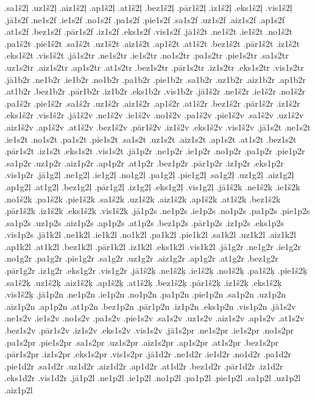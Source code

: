 {.sa1š2ļ
.uz1š2ļ
.aiz1š2ļ
.ap1š2ļ
.at1š2ļ
.bez1š2ļ
.pār1š2ļ
.iz1š2ļ
.eks1š2ļ
.vis1š2ļ
.jā1s2f
.ne1s2f
.ie1s2f
.no1s2f
.pa1s2f
.pie1s2f
.sa1s2f
.uz1s2f
.aiz1s2f
.ap1s2f
.at1s2f
.bez1s2f
.pār1s2f
.iz1s2f
.eks1s2f
.vis1s2f
.jā1š2t
.ne1š2t
.ie1š2t
.no1š2t
.pa1š2t
.pie1š2t
.sa1š2t
.uz1š2t
.aiz1š2t
.ap1š2t
.at1š2t
.bez1š2t
.pār1š2t
.iz1š2t
.eks1š2t
.vis1š2t
.jā1s2tr
.ne1s2tr
.ie1s2tr
.no1s2tr
.pa1s2tr
.pie1s2tr
.sa1s2tr
.uz1s2tr
.aiz1s2tr
.ap1s2tr
.at1s2tr
.bez1s2tr
.pār1s2tr
.iz1s2tr
.eks1s2tr
.vis1s2tr
.jā1b2r
.ne1b2r
.ie1b2r
.no1b2r
.pa1b2r
.pie1b2r
.sa1b2r
.uz1b2r
.aiz1b2r
.ap1b2r
.at1b2r
.bez1b2r
.pār1b2r
.iz1b2r
.eks1b2r
.vis1b2r
.jā1š2r
.ne1š2r
.ie1š2r
.no1š2r
.pa1š2r
.pie1š2r
.sa1š2r
.uz1š2r
.aiz1š2r
.ap1š2r
.at1š2r
.bez1š2r
.pār1š2r
.iz1š2r
.eks1š2r
.vis1š2r
.jā1š2v
.ne1š2v
.ie1š2v
.no1š2v
.pa1š2v
.pie1š2v
.sa1š2v
.uz1š2v
.aiz1š2v
.ap1š2v
.at1š2v
.bez1š2v
.pār1š2v
.iz1š2v
.eks1š2v
.vis1š2v
.jā1s2t
.ne1s2t
.ie1s2t
.no1s2t
.pa1s2t
.pie1s2t
.sa1s2t
.uz1s2t
.aiz1s2t
.ap1s2t
.at1s2t
.bez1s2t
.pār1s2t
.iz1s2t
.eks1s2t
.vis1s2t
.jā1p2r
.ne1p2r
.ie1p2r
.no1p2r
.pa1p2r
.pie1p2r
.sa1p2r
.uz1p2r
.aiz1p2r
.ap1p2r
.at1p2r
.bez1p2r
.pār1p2r
.iz1p2r
.eks1p2r
.vis1p2r
.jā1g2ļ
.ne1g2ļ
.ie1g2ļ
.no1g2ļ
.pa1g2ļ
.pie1g2ļ
.sa1g2ļ
.uz1g2ļ
.aiz1g2ļ
.ap1g2ļ
.at1g2ļ
.bez1g2ļ
.pār1g2ļ
.iz1g2ļ
.eks1g2ļ
.vis1g2ļ
.jā1š2k
.ne1š2k
.ie1š2k
.no1š2k
.pa1š2k
.pie1š2k
.sa1š2k
.uz1š2k
.aiz1š2k
.ap1š2k
.at1š2k
.bez1š2k
.pār1š2k
.iz1š2k
.eks1š2k
.vis1š2k
.jā1p2s
.ne1p2s
.ie1p2s
.no1p2s
.pa1p2s
.pie1p2s
.sa1p2s
.uz1p2s
.aiz1p2s
.ap1p2s
.at1p2s
.bez1p2s
.pār1p2s
.iz1p2s
.eks1p2s
.vis1p2s
.jā1k2l
.ne1k2l
.ie1k2l
.no1k2l
.pa1k2l
.pie1k2l
.sa1k2l
.uz1k2l
.aiz1k2l
.ap1k2l
.at1k2l
.bez1k2l
.pār1k2l
.iz1k2l
.eks1k2l
.vis1k2l
.jā1g2r
.ne1g2r
.ie1g2r
.no1g2r
.pa1g2r
.pie1g2r
.sa1g2r
.uz1g2r
.aiz1g2r
.ap1g2r
.at1g2r
.bez1g2r
.pār1g2r
.iz1g2r
.eks1g2r
.vis1g2r
.jā1š2ķ
.ne1š2ķ
.ie1š2ķ
.no1š2ķ
.pa1š2ķ
.pie1š2ķ
.sa1š2ķ
.uz1š2ķ
.aiz1š2ķ
.ap1š2ķ
.at1š2ķ
.bez1š2ķ
.pār1š2ķ
.iz1š2ķ
.eks1š2ķ
.vis1š2ķ
.jā1p2n
.ne1p2n
.ie1p2n
.no1p2n
.pa1p2n
.pie1p2n
.sa1p2n
.uz1p2n
.aiz1p2n
.ap1p2n
.at1p2n
.bez1p2n
.pār1p2n
.iz1p2n
.eks1p2n
.vis1p2n
.jā1s2v
.ne1s2v
.ie1s2v
.no1s2v
.pa1s2v
.pie1s2v
.sa1s2v
.uz1s2v
.aiz1s2v
.ap1s2v
.at1s2v
.bez1s2v
.pār1s2v
.iz1s2v
.eks1s2v
.vis1s2v
.jā1s2pr
.ne1s2pr
.ie1s2pr
.no1s2pr
.pa1s2pr
.pie1s2pr
.sa1s2pr
.uz1s2pr
.aiz1s2pr
.ap1s2pr
.at1s2pr
.bez1s2pr
.pār1s2pr
.iz1s2pr
.eks1s2pr
.vis1s2pr
.jā1d2r
.ne1d2r
.ie1d2r
.no1d2r
.pa1d2r
.pie1d2r
.sa1d2r
.uz1d2r
.aiz1d2r
.ap1d2r
.at1d2r
.bez1d2r
.pār1d2r
.iz1d2r
.eks1d2r
.vis1d2r
.jā1p2l
.ne1p2l
.ie1p2l
.no1p2l
.pa1p2l
.pie1p2l
.sa1p2l
.uz1p2l
.aiz1p2l
}
